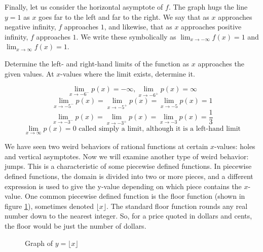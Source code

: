 Finally, let us consider the horizontal asymptote of $f$. The graph hugs the line 
$y = 1$ as $x$ goes far to the left and far to the right. We say that as $x$ 
approaches negative infinity, $f$ approaches $1$, and likewise, that as $x$ 
approaches positive infinity, $f$ approaches $1$. We write these symbolically as 
$\lim_{x \rightarrow -\infty} f(x) = 1$ and $\lim_{x \rightarrow \infty} f(x) = 1$. 

\begin{Exercise}[title=Limits Practice 1, label=limits1]
  Determine the left- and right-hand limits of the function as $x$ approaches the 
  given values. At $x$-values where the limit exists, determine it.
  \vspace{40mm}
\end{Exercise}
\begin{Answer}[ref=limits1] 
	$$ \lim_{x \rightarrow -6^-} p(x) = -\infty, \lim_{x \rightarrow -6^+} p(x) = \infty $$
	$$ \lim_{x \rightarrow -5^-} p(x) = \lim_{x \rightarrow -5^+} p(x) = \lim_{x \rightarrow -5} p(x) = 1 $$
	$$ \lim_{x \rightarrow -3^-} p(x) = \lim_{x \rightarrow -3^+} p(x) = \lim_{x \rightarrow -3} p(x) = \frac{1}{3} $$
	$$ \lim_{x \rightarrow \infty} p(x) = 0 \text{ called simply a limit, although it is a left-hand limit} $$
\end{Answer}

We have seen two weird behaviors of rational functions at certain $x$-values: holes 
and vertical asymptotes. Now we will examine another type of weird behavior: jumps. 
This is a characteristic of some piecewise defined functions. In piecewise defined 
functions, the domain is divided into two or more pieces, and a different 
expression is used to give the y-value depending on which piece contains the $x$-
value. One common piecewise defined function is the floor function (shown in 
figure \ref{fig:floor}), sometimes denoted $\lfloor x \rfloor$. The standard 
floor function rounds any real number down to the nearest integer. So, for a 
price quoted in dollars and cents, the floor would be just the number of 
dollars.

\begin{figure}[htbp]
  \centering
  \caption{Graph of \( y = \lfloor x \rfloor \)}
  \label{fig:floor}
\end{figure}	

